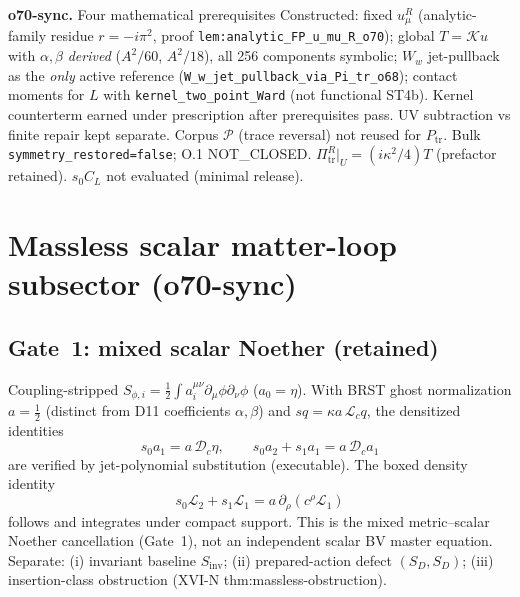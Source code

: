 \noindent\textbf{o70-sync.} Four mathematical prerequisites Constructed:
fixed $u_\mu^R$ (analytic-family residue $r=-i\pi^2$, proof
\texttt{lem:analytic\_FP\_u\_mu\_R\_o70});
global $T=\mathcal K u$ with $\alpha,\beta$ \emph{derived} ($A^2/60$, $A^2/18$),
all 256 components symbolic;
$W_w$ jet-pullback as the \emph{only} active reference
(\texttt{W\_w\_jet\_pullback\_via\_Pi\_tr\_o68});
contact moments for $L$ with
\texttt{kernel\_two\_point\_Ward} (not functional ST4b).
Kernel counterterm earned under prescription after prerequisites pass.
UV subtraction vs finite repair kept separate.
Corpus $\mathcal{P}$ (trace reversal) not reused for $P_{\mathrm{tr}}$.
Bulk \texttt{symmetry\_restored=false}; O.1 NOT\_CLOSED.
$\Pi_{\mathrm{tr}}^R|_U=(i\kappa^2/4)T$ (prefactor retained).
$s_0C_L$ not evaluated (minimal release).

\section{Massless scalar matter-loop subsector (o70-sync)}
\label{sec:O-matter-loop}


\subsection{Gate~1: mixed scalar Noether (retained)}
Coupling-stripped $S_{\phi,i}=\tfrac12\int a_i^{\mu\nu}\partial_\mu\phi\partial_\nu\phi$
($a_0=\eta$). With BRST ghost normalization $a=\tfrac12$ (distinct from D11
coefficients $\alpha,\beta$) and $sq=\kappa a\,\mathcal L_c q$, the densitized
identities
\[
s_0a_1=a\,\mathcal D_c\eta,\qquad
s_0a_2+s_1a_1=a\,\mathcal D_c a_1
\]
are verified by jet-polynomial substitution (executable). The boxed density identity
\[
\boxed{s_0\mathcal L_2+s_1\mathcal L_1=a\,\partial_\rho(c^\rho\mathcal L_1)}
\]
follows and integrates under compact support. This is the mixed metric--scalar
Noether cancellation (Gate~1), not an independent scalar BV master equation.
Separate: (i) invariant baseline $S_{\mathrm{inv}}$;
(ii) prepared-action defect $(S_D,S_D)$;
(iii) insertion-class obstruction (XVI-N thm:massless-obstruction).


